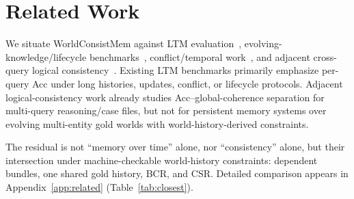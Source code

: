 \section{Related Work}
\label{sec:related}

We situate WorldConsistMem against LTM evaluation~\citep{wu2025longMemEval,wu2026longMemEvalV2,hu2025memoryAgentBench,wang2026evoMemBench,hu2026everMemBench}, evolving-knowledge/lifecycle benchmarks~\citep{xie2026dynamicMem,liu2026worldMemArena}, conflict/temporal work~\citep{tao2026memConflict}, and adjacent cross-query logical consistency~\citep{salla2026crossQueryContradictions,chaudhry2026logicVault}. Existing LTM benchmarks primarily emphasize per-query Acc under long histories, updates, conflict, or lifecycle protocols. Adjacent logical-consistency work already studies Acc--global-coherence separation for multi-query reasoning/case files, but not for persistent memory systems over evolving multi-entity gold worlds with world-history-derived constraints.

The residual is not ``memory over time'' alone, nor ``consistency'' alone, but their intersection under machine-checkable world-history constraints: dependent bundles, one shared gold history, BCR, and CSR. Detailed comparison appears in Appendix~\ref{app:related} (Table~\ref{tab:closest}).
